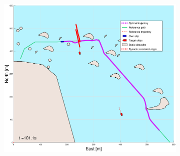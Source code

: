 \begin{figure}[!ht]
\begin{subfigure}[b]{0.494\textwidth}
        \subcaption{}
    \end{subfigure}
    \hfill
    \begin{subfigure}[b]{0.494\textwidth}
        \centering
        \includegraphics[width=\textwidth]{Images/Figures/skjergard_m_trafikk_NEW/_Simple_0fig999_time=101}
        \subcaption{}
    \end{subfigure}
    \hfill
\end{figure}%

